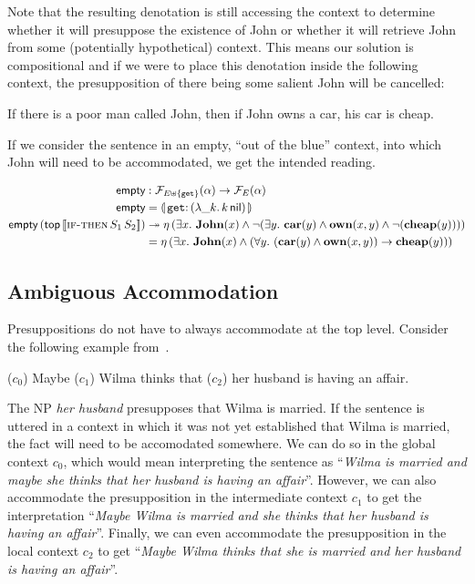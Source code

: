Note that the resulting denotation is still accessing the context to
determine whether it will presuppose the existence of John or whether it
will retrieve John from some (potentially hypothetical) context. This means
our solution is compositional and if we were to place this denotation
inside the following context, the presupposition of there being some
salient John will be cancelled:

\begin{exe}
  \ex If there is a poor man called John, then if John owns a car, his car
  is cheap.
\end{exe}

If we consider the sentence in an empty, ``out of the blue'' context, into
which John will need to be accommodated, we get the intended reading.

\begin{align*}
  \EMPTY &: \FF_{E \uplus \{\op{get}\}}(\alpha) \to \FF_E(\alpha) \\
  \EMPTY &= \banana{\onto{\op{get}}{(\lam{\_ k}{\ap{k}{\nil}})}} \\
  \ap{\EMPTY}{(\ap{\TOP}{\sem{\app{\abs{if-then}}{S_1}{S_2}}})}
  &\tto \etaE{(\exists x.\ \obj{John}(x) \land \lnot (\exists y.\ \obj{car}(y) \land \obj{own}(x, y) \land \lnot (\obj{cheap}(y))))} \\
  &= \etaE{(\exists x.\ \obj{John}(x) \land (\forall y.\ (\obj{car}(y) \land \obj{own}(x, y)) \to \obj{cheap}(y)))}
\end{align*}


\subsection{Ambiguous Accommodation}
\label{ssec:ambiguous-accommodation}

Presuppositions do not have to always accommodate at the top
level. Consider the following example from~\cite{sep-presupposition}.

\begin{exe}
  \ex \label{ex:wilma} ($c_0$) Maybe ($c_1$) Wilma thinks that ($c_2$) her husband is having an affair.
\end{exe}

The NP \emph{her husband} presupposes that Wilma is married. If the
sentence is uttered in a context in which it was not yet established that
Wilma is married, the fact will need to be accomodated somewhere. We can do
so in the global context $c_0$, which would mean interpreting the sentence
as ``\emph{Wilma is married and maybe she thinks that her husband is having
  an affair}''. However, we can also accommodate the presupposition in the
intermediate context $c_1$ to get the interpretation ``\emph{Maybe Wilma is
  married and she thinks that her husband is having an affair}''. Finally,
we can even accommodate the presupposition in the local context $c_2$ to
get ``\emph{Maybe Wilma thinks that she is married and her husband is
  having an affair}''.


